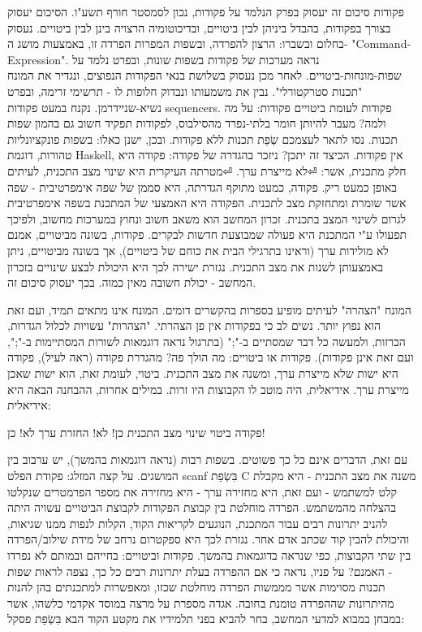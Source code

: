 \begin{טבלא}[!htbp]
        פקודות
        סיכום זה יעסוק בפרק הנלמד על פקודות, נכון לסמסטר חורף תשע"ו. הסיכום יעסוק בצורך
        בפקודות, בהבדל ביניהן לבין ביטויים, ובדיכוטומיה הרצויה בינן לבין ביטויים. נעסוק
        בחלום ובשברו: הרצון להפרדה, ובשפות המפרות הפרדה זו, באמצעות מושג ה-
        "Command-Expression". נראה מערכות של פקודות בשפות שונות, ובפרט נלמד על
        שפות-מונחות-ביטויים. לאחר מכן נעסוק בשלושת בנאי הפקודות הנפוצים, ונגדיר את
        המונח "תכנות סטרקטורלי". נבין את משמעותו ונבדוק חלופות לו - תרשימי זרימה, ובפרט
        נשיא-שניידרמן. נקנח במעט פקודות sequencers. פקודות לעומת ביטויים
        פקודות: על מה ולמה?
        מעבר להיותן חומר בלתי-נפרד מהסילבוס, לפקודות תפקיד חשוב גם בהמון שפות תכנות. נסו לתאר לעצמכם שְׂפַת תכנות ללא פקודות. ובכן, ישנן כאלו: בשפות פונקציונליות טהורות, דוגמת Haskell, אין פקודות. הכיצד זה יתכן?
        ניזכר בהגדרה של פקודה:
        פקודה היא חלק מתכנית, אשר:
⏎לא מייצרת ערך.
⏎מטרתה העיקרית היא שינוי מצב התכנית, לעיתים באופן כמעט ריק.
        פקודה, כמעט מתוקף הגדרתה, היא סממן של שפה אימפרטיבית - שפה אשר שומרת ומתחזקת מצב לתכנית. הפקודה היא האמצעי של המתכנת בשפה אימפרטיבית לגרום לשינוי המצב בתכנית.
        זכרון המחשב הוא משאב חשוב ונחוץ במערכות מחשוב, ולפיכך תפעולו ע"י המתכנת היא פעולה שמבוצעת חדשות לבקרים. פקודות, בשונה מביטויים, אמנם לא מולידות ערך (וראינו בתרגילי הבית את כוחם של ביטויים), אך בשונה מביטויים, ניתן באמצעותן לשנות את מצב התכנית. נגזרת ישירה לכך היא היכולת לבצע שינויים בזכרון המחשב - יכולת חשובה מאין כמוה. בכך יעסוק סיכום זה.

        המונח "הצהרה" לעיתים מופיע בספרות בהקשרים דומים. המונח אינו מתאים תמיד, ועם זאת הוא נפוץ יותר. נשים לב כי בפקודות אין פן הצהרתי. "הצהרות" עשויות לכלול הגדרות, הכרזות, ולמעשה כל דבר שמסתיים ב-";" (בתרגול נראה דוגמאות לשורות המסתיימות ב-";", ועם זאת אינן פקודות).
        פקודות או ביטויים: מה הולך פה?
        מהגדרת פקודה (ראה לעיל), פקודה היא ישות שלא מייצרת ערך, ומשנה את מצב התכנית. ביטוי, לעומת זאת, הוא ישות שאכן מייצרת ערך. אידיאלית, היה מוטב לו הקבוצות היו זרות. במילים אחרות, ההבחנה הבאה היא אידיאלית:

        פקודה
        ביטוי
        שינוי מצב התכנית
        כן!
        לא!
        החזרת ערך
        לא!
        כן!

        עם זאת, הדברים אינם כל כך פשוטים. בשפות רבות (נראה דוגמאות בהמשך), יש ערבוב בין
        המושגים. על קצה המזלג: פקודת הפלט scanf בִּשְׂפַת C משנה את מצב התכנית - היא מקבלת
        קלט למשתמש - ועם זאת, היא מחזירה ערך - היא מחזירה את מספר הפרמטרים שנקלטו
        בהצלחה מהמשתמש. הפרדה מוחלטת בין קבוצת הפקודות לקבוצת הביטויים עשויה היתה
        להניב יתרונות רבים עבור המתכנת, הנוגעים לקריאות הקוד, הקלות לנפות ממנו שגיאות,
        והיכולת להבין קוד שכתב אדם אחר. נגזרת לכך היא ספקטרום נרחב של מידת שילוב/הפרדה
        בין שתי הקבוצות, כפי שנראה בדוגמאות בהמשך. פקודות וביטויים: בחייהם ובמותם לא
        נפרדו - האמנם? על פניו, נראה כי אם ההפרדה בעלת יתרונות רבים כל כך, נצפה לראות
        שפות תכנות מסוימות אשר מממשות הפרדה מוחלטת שכזו, ומאפשרות למתכנתים בהן להנות
        מהיתרונות שההפרדה טומנת בחובה. אגדה מספרת על מרצה במוסד אקדמי כלשהו, אשר במבחן
        במבוא למדעי המחשב, בחר להביא בפני תלמידיו את מקטע הקוד הבא בִּשְׂפַת פסקל:


\end{טבלא}
